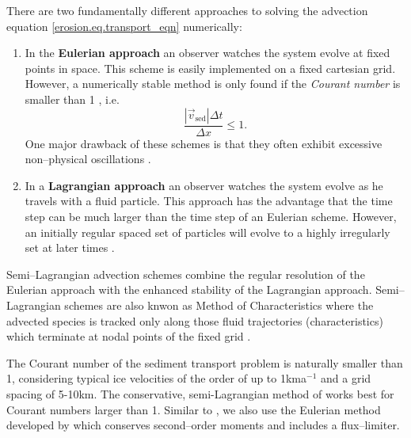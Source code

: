 There are two fundamentally different approaches to solving the advection equation \eqref{erosion.eq.transport_eqn} numerically:
\begin{enumerate}
\item In the \textbf{Eulerian approach} an observer watches the system evolve at fixed points in space. This scheme is easily implemented on a fixed cartesian grid. However, a numerically stable method is only found if the \emph{Courant number} is smaller than 1 \citep{Press1992}, i.e.
  \begin{equation}
    \frac{|\vec{v}_{\text{sed}}|\Delta t}{\Delta x}\le1.
  \end{equation}
  One major drawback of these schemes is that they often exhibit excessive non--physical oscillations \citep{Celia1990}.
\item In a \textbf{Lagrangian approach} an observer watches the system evolve as he travels with a fluid particle. This approach has the advantage that the time step can be much larger than the time step of an Eulerian scheme. However, an initially regular spaced set of particles will evolve to a highly irregularly set at later times \citep{Staniforth1991}.
\end{enumerate}
Semi--Lagrangian advection schemes combine the regular resolution of the Eulerian approach with the enhanced stability of the Lagrangian approach. Semi--Lagrangian schemes are also knwon as Method of Characteristics where the advected species is tracked only along those fluid trajectories (characteristics) which terminate at nodal points of the fixed grid \citep{Manson2000}.

The Courant number of the sediment transport problem is naturally smaller than 1, considering typical ice velocities of the order of up to 1kma$^{-1}$ and a grid spacing of 5-10km. The conservative, semi-Lagrangian method of \citet{Manson1999} works best for Courant numbers larger than 1. Similar to \citet{Hildes2004}, we also use the Eulerian method developed by \citet{Prather1986} which conserves second--order moments and includes a flux--limiter.
